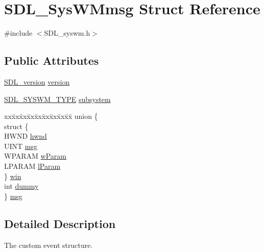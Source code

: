 \hypertarget{struct_s_d_l___sys_w_mmsg}{}\section{S\+D\+L\+\_\+\+Sys\+W\+Mmsg Struct Reference}
\label{struct_s_d_l___sys_w_mmsg}


{\ttfamily \#include $<$S\+D\+L\+\_\+syswm.\+h$>$}

\subsection*{Public Attributes}
\begin{DoxyCompactItemize}
\item 
\hyperlink{struct_s_d_l__version}{S\+D\+L\+\_\+version} \hyperlink{struct_s_d_l___sys_w_mmsg_a95f9aae58d18ee8fac556416b322a5fb}{version}
\item 
\hyperlink{_s_d_l__syswm_8h_a064c26598287280fff2a00d6758ac4f7}{S\+D\+L\+\_\+\+S\+Y\+S\+W\+M\+\_\+\+T\+Y\+PE} \hyperlink{struct_s_d_l___sys_w_mmsg_a7c3900af5ea797f1318fc77ee0ecd11b}{subsystem}
\item 
\begin{tabbing}
xx\=xx\=xx\=xx\=xx\=xx\=xx\=xx\=xx\=\kill
union \{\\
\>struct \{\\
\>\>HWND \hyperlink{struct_s_d_l___sys_w_mmsg_a55cf9583b5eddfe60a5c9851f9cce457}{hwnd}\\
\>\>UINT \hyperlink{struct_s_d_l___sys_w_mmsg_a74894ed060d5508ab06aac584154d61e}{msg}\\
\>\>WPARAM \hyperlink{struct_s_d_l___sys_w_mmsg_a7463730478d90ebc031d83098f3f74fc}{wParam}\\
\>\>LPARAM \hyperlink{struct_s_d_l___sys_w_mmsg_a24c1e4c3cb8d9781d34e5d99df66ac36}{lParam}\\
\>\} \hyperlink{struct_s_d_l___sys_w_mmsg_a821fbcd0ab199aee76cc29caff7e5b64}{win}\\
\>int \hyperlink{struct_s_d_l___sys_w_mmsg_a8faf13f90f2477157b42b631308cd900}{dummy}\\
\} \hyperlink{struct_s_d_l___sys_w_mmsg_a15c65629cc42da3fe3776379a5ecf8e4}{msg}\\

\end{tabbing}\end{DoxyCompactItemize}


\subsection{Detailed Description}
The custom event structure. 

